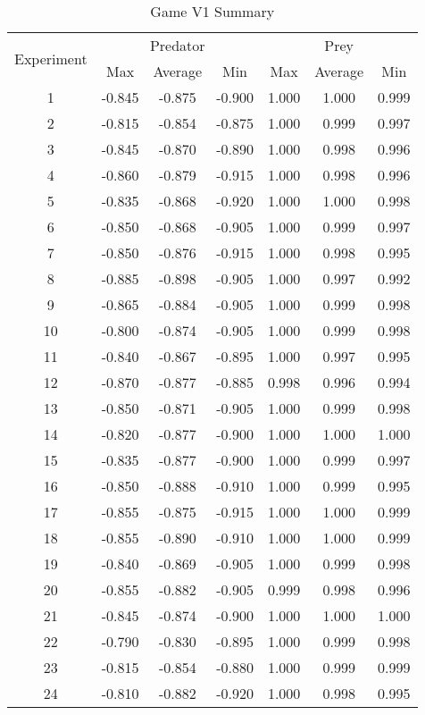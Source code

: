 \begin{table}
  \centering
  \begin{tabular}{|c|c|c|c|c|c|c|}
    \hline
    \multirow{2}{*}{Experiment} & \multicolumn{3}{|c|}{Predator} & \multicolumn{3}{|c|}{Prey} \\\cline{2-7}
    & Max & Average & Min & Max & Average & Min\\
    \hline
    1 & -0.845 & -0.875 & -0.900 & 1.000 & 1.000 & 0.999 \\
2 & -0.815 & -0.854 & -0.875 & 1.000 & 0.999 & 0.997 \\
3 & -0.845 & -0.870 & -0.890 & 1.000 & 0.998 & 0.996 \\
4 & -0.860 & -0.879 & -0.915 & 1.000 & 0.998 & 0.996 \\
5 & -0.835 & -0.868 & -0.920 & 1.000 & 1.000 & 0.998 \\
6 & -0.850 & -0.868 & -0.905 & 1.000 & 0.999 & 0.997 \\
7 & -0.850 & -0.876 & -0.915 & 1.000 & 0.998 & 0.995 \\
8 & -0.885 & -0.898 & -0.905 & 1.000 & 0.997 & 0.992 \\
9 & -0.865 & -0.884 & -0.905 & 1.000 & 0.999 & 0.998 \\
10 & -0.800 & -0.874 & -0.905 & 1.000 & 0.999 & 0.998 \\
11 & -0.840 & -0.867 & -0.895 & 1.000 & 0.997 & 0.995 \\
12 & -0.870 & -0.877 & -0.885 & 0.998 & 0.996 & 0.994 \\
13 & -0.850 & -0.871 & -0.905 & 1.000 & 0.999 & 0.998 \\
14 & -0.820 & -0.877 & -0.900 & 1.000 & 1.000 & 1.000 \\
15 & -0.835 & -0.877 & -0.900 & 1.000 & 0.999 & 0.997 \\
16 & -0.850 & -0.888 & -0.910 & 1.000 & 0.999 & 0.995 \\
17 & -0.855 & -0.875 & -0.915 & 1.000 & 1.000 & 0.999 \\
18 & -0.855 & -0.890 & -0.910 & 1.000 & 1.000 & 0.999 \\
19 & -0.840 & -0.869 & -0.905 & 1.000 & 0.999 & 0.998 \\
20 & -0.855 & -0.882 & -0.905 & 0.999 & 0.998 & 0.996 \\
21 & -0.845 & -0.874 & -0.900 & 1.000 & 1.000 & 1.000 \\
22 & -0.790 & -0.830 & -0.895 & 1.000 & 0.999 & 0.998 \\
23 & -0.815 & -0.854 & -0.880 & 1.000 & 0.999 & 0.999 \\
24 & -0.810 & -0.882 & -0.920 & 1.000 & 0.998 & 0.995\\
\hline
  \end{tabular}
  \caption{Game V1 Summary }
  \label{tab:v1-summary}
\end{table}


